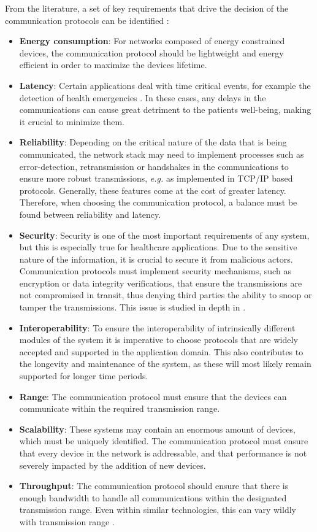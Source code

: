 From the literature, a set of key requirements that drive the decision of the communication protocols can be identified \cite{Baker2017, Catarinucci2015, Adame2018}:

\begin{itemize}
    \item \textbf{Energy consumption}: For networks composed of energy constrained devices, the communication protocol should be lightweight and energy efficient in order to maximize the devices lifetime. 
    \item \textbf{Latency}: Certain applications deal with time critical events, for example the detection of health emergencies \cite{Catarinucci2015}. In these cases, any delays in the communications can cause great detriment to the patients well-being, making it crucial to minimize them.
    \item \textbf{Reliability}: Depending on the critical nature of the data that is being communicated, the network stack may need to implement processes such as error-detection, retransmission or handshakes in the communications to ensure more robust transmissions, \textit{e.g.} as implemented in TCP/IP based protocols. Generally, these features come at the cost of greater latency. Therefore, when choosing the communication protocol, a balance must be found between reliability and latency.
    \item \textbf{Security}: Security is one of the most important requirements of any system, but this is especially true for healthcare applications. Due to the sensitive nature of the information, it is crucial to secure it from malicious actors. Communication protocols must implement security mechanisms, such as encryption or data integrity verifications, that ensure the transmissions are not compromised in transit, thus denying third parties the ability to snoop or tamper the transmissions. This issue is studied in depth in \cite{Gope2016}.
    \item \textbf{Interoperability}: To ensure the interoperability of intrinsically different modules of the system it is imperative to choose protocols that are widely accepted and supported in the application domain. This also contributes to the longevity and maintenance of the system, as these will most likely remain supported for longer time periods. 
    \item \textbf{Range}: The communication protocol must ensure that the devices can communicate within the required transmission range.
    \item \textbf{Scalability}: These systems may contain an enormous amount of devices, which must be uniquely identified. The communication protocol must ensure that every device in the network is addressable, and that performance is not severely impacted by the addition of new devices.
    \item \textbf{Throughput}: The communication protocol should ensure that there is enough bandwidth to handle all communications within the designated transmission range. Even within similar technologies, this can vary wildly with transmission range \cite{10.5555/3161403}.
\end{itemize}

